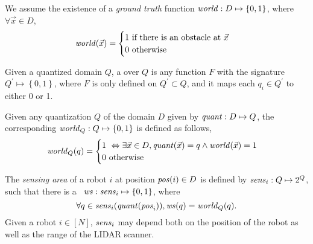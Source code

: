 We assume the existence of a \emph{ground truth} function $\mathit{world} : D\mapsto \left\{0,1\right\}$, where $\forall \Vec{x} \in D$, $$\world(\Vec{x}) = \begin{cases}
                                                                                                                                                                        1\ \mbox{if there is an obstacle at }\Vec{x}\\
                                                                                                                                                                        0\ \mbox{otherwise}
\end{cases}
$$


\begin{definition}
    Given a quantized domain $Q$, a \emph{\qdfunc} over $Q$ is any function $F$ with the signature $Q^\prime \mapsto \left\{0,1\right\}$, where $F$ is only defined on $Q^\prime \subset Q$, and it maps each $q_i \in Q^\prime$ to either 0 or 1.
\end{definition}


Given any quantization $Q$ of the domain $D$ given by $\mathit{quant}:D\mapsto Q$, the corresponding \qdfunc
$\mathit{world}_Q : Q \mapsto \left\{0,1\right\}$ is defined as follows,  $$\world_Q(q) = \begin{cases}
                                                                                      1\ \Leftrightarrow \exists \Vec{x}\in D, \qfunc(\Vec{x}) = q \wedge \world(\Vec{x}) = 1 \\
                                                                                      0\ \mbox{otherwise}
\end{cases}
$$




\begin{definition}
    The \emph{sensing area} of a robot $i$ at position $\mathit{pos}(i)\in D$ is defined by $\mathit{sens}_i: Q \mapsto 2^{Q}$, such that there is a \qdfunc\ $\mathit{ws} : \mathit{sens}_i \mapsto \left\{0,1\right\}$, where $$\forall q \in \mathit{sens}_i(\mathit{quant}(\mathit{pos}_i)), \mathit{ws}(q) = \mathit{world}_Q(q).$$
    Given a robot $i \in [N]$, $\mathit{sens}_i$ may depend both on the position of the robot as well as the range of the LIDAR scanner.
\end{definition}




